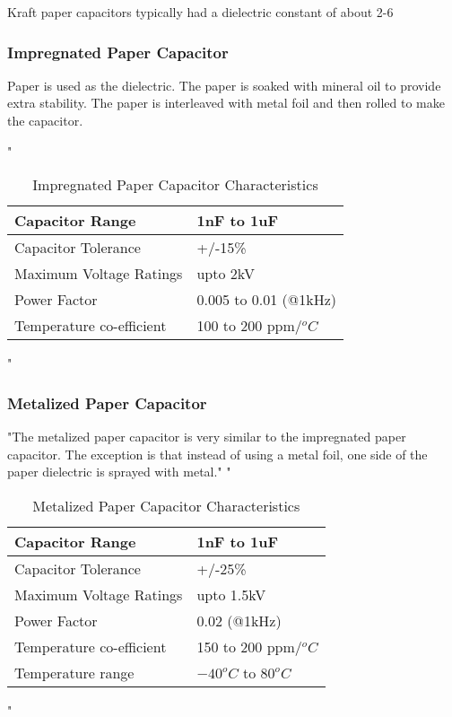         Kraft paper capacitors typically had a dielectric constant of about 2-6 \cite[ch.~8.1]{poorIntro}

    \subsubsection{Impregnated Paper Capacitor}
        Paper is used as the dielectric. The paper is soaked with mineral oil to provide extra stability. The paper is interleaved with metal foil and then rolled to make the capacitor. \cite[ch.~8.2.1.1]{poorIntro}

        "
        \begin{table}
        \begin{tabular}{| l | l | }
        \hline
            Capacitor Range          & 1nF to 1uF            \\ \hline
            Capacitor Tolerance      & +/-15\%               \\ \hline
            Maximum Voltage Ratings  & upto 2kV              \\ \hline
            Power Factor             & 0.005 to 0.01 (@1kHz) \\ \hline
            Temperature co-efficient & 100 to 200 ppm/$^oC$  \\ \hline
        \end{tabular}
        \caption{Impregnated Paper Capacitor Characteristics}\cite[ch.~8.2.1.1]{poorIntro}
        \end{table}
        "
    
    \subsubsection{Metalized Paper Capacitor}
        "The metalized paper capacitor is very similar to the impregnated paper capacitor. The exception is that instead of using a metal foil, one side of the paper dielectric is sprayed with metal." \cite{hist_cerFilt}
     "
        \begin{table}
        \begin{tabular}{| l | l | }
        \hline
            Capacitor Range          & 1nF to 1uF           \\ \hline
            Capacitor Tolerance      & +/-25\%              \\ \hline
            Maximum Voltage Ratings  & upto 1.5kV           \\ \hline
            Power Factor             & 0.02 (@1kHz)         \\ \hline
            Temperature co-efficient & 150 to 200 ppm/$^oC$ \\ \hline
            Temperature range        & $-40^oC$ to $80^oC$  \\ \hline
        \end{tabular}
        \caption{Metalized Paper Capacitor Characteristics}\cite[ch.~8.2.1.1]{poorIntro}
        \end{table}
     "

